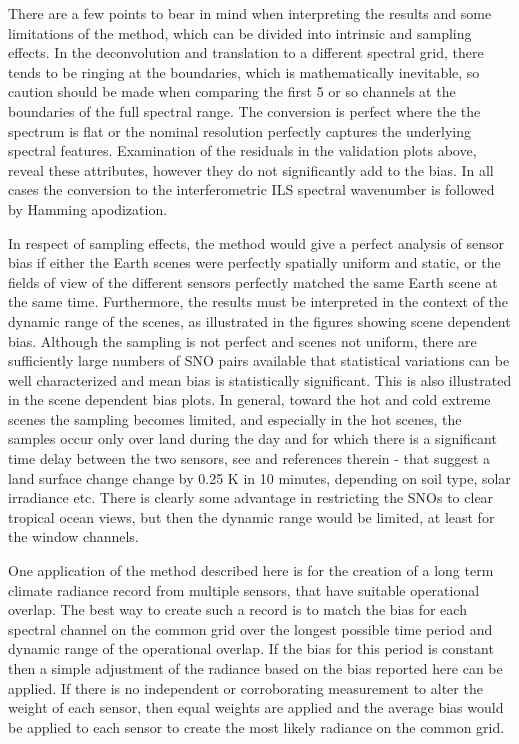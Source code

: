 \documentclass[11pt]{article}
\begin{document}
There are a few points to bear in mind when interpreting the results and some limitations of the method, which can be divided into intrinsic and sampling effects. In the deconvolution and translation to a different spectral grid, there tends to be ringing at the boundaries, which is mathematically inevitable, so caution should be made when comparing the first 5 or so channels at the boundaries of the full spectral range. The conversion is perfect where the the spectrum is flat or the nominal resolution perfectly captures the underlying spectral features. Examination of the residuals in the validation plots above, reveal these attributes, however they do not significantly add to the bias. In all cases the conversion to the interferometric ILS spectral wavenumber is followed by Hamming apodization.

In respect of sampling effects, the method would give a perfect analysis of sensor bias if either the Earth scenes were perfectly spatially uniform and static, or the fields of view of the different sensors perfectly matched the same Earth scene at the same time. Furthermore, the results must be interpreted in the context of the dynamic range of the scenes, as illustrated in the figures showing scene dependent bias. Although the sampling is not perfect and scenes not uniform, there are sufficiently large numbers of SNO pairs available that statistical variations can be well characterized and mean bias is statistically significant. This is also illustrated in the scene dependent bias plots. In general, toward the hot and cold extreme scenes the sampling becomes limited, and especially in the hot scenes, the samples occur only over land during the day and for which there is a significant time delay between the two sensors, see \cite{Duan2014} and references therein - that suggest a land surface change change by 0.25 K in 10 minutes, depending on soil type, solar irradiance etc. There is clearly some advantage in restricting the SNOs to clear tropical ocean views, but then the dynamic range would be limited, at least for the window channels.

One application of the method described here is for the creation of a long term climate radiance record from multiple sensors, that have suitable operational overlap. The best way to create such a record is to match the bias for each spectral channel on the common grid over the longest possible time period and dynamic range of the operational overlap. If the bias for this period is constant then a simple adjustment of the radiance based on the bias reported here can be applied. If there is no independent or corroborating measurement to alter the weight of each sensor, then equal weights are applied and the average bias would be applied to each sensor to create the most likely radiance on the common grid.
\end{document}
